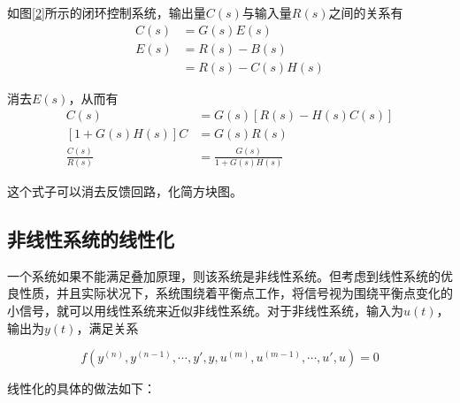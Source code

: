 如图\ref{2}所示的闭环控制系统，输出量$C(s)$与输入量$R(s)$之间的关系有
\begin{align*}
C(s)&=G(s)E(s)\\
E(s)&=R(s)-B(s)\\
&=R(s)-C(s)H(s)
\end{align*}

消去$E(s)$，从而有
\begin{align*}
C(s)&=G(s)[R(s)-H(s)C(s)]\\
[1+G(s)H(s)]C&=G(s)R(s)\\
\frac{C(s)}{R(s)}&=\frac{G(s)}{1+G(s)H(s)}
\end{align*}

这个式子可以消去反馈回路，化简方块图。

\subsection{非线性系统的线性化}

一个系统如果不能满足叠加原理，则该系统是非线性系统。但考虑到线性系统的优良性质，并且实际状况下，系统围绕着平衡点工作，将信号视为围绕平衡点变化的小信号，就可以用线性系统来近似非线性系统。对于非线性系统，输入为$u(t)$，输出为$y(t)$，满足关系

\begin{equation*}
	f(y^{(n)},y^{(n-1)},\cdots,y',y,u^{(m)},u^{(m-1)},\cdots,u',u)=0
\end{equation*}

线性化的具体的做法如下：

